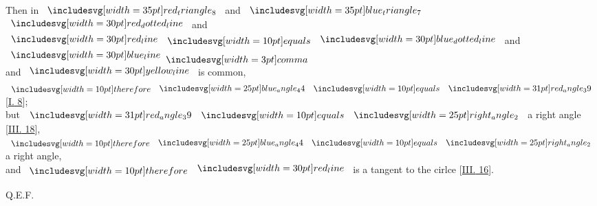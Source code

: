 \documentclass[12pt,preview]{standalone}
\begin{document}
\hfill

\hfill

\pagebreak

\begin{minipage}[t]{0.33\textwidth}
    \phantom{}
\end{minipage}%
\hfill
\begin{minipage}[t]{0.64\textwidth}
    \vspace{0pt}

    \begin{center}
        Then in $\img[0][0][35]{red_triangle_8}$ and $\img[0][0][35]{blue_triangle_7}$\\
        $\dottedredline$ and $\redline \bequals \dottedblueline$ and $\blueline \bcomma$\\
        and $\yellowline$ is common,\\
        $\btherefore \img{blue_angle_44} \bequals \img[0][0][31]{red_angle_39}$ [\hyperref[book1pr8]{\textsc{I.} 8}];\\
        but $\img[0][0][31]{red_angle_39} \bequals \img{right_angle_2}$ a right angle [\hyperref[book3pr18]{\textsc{III.} 18}],\\
        $\btherefore \img{blue_angle_44} \bequals \img{right_angle_2}$ a right angle,\\
        and $\btherefore \redline$ is a tangent to the cirlce [\hyperref[book3pr16]{\textsc{III.} 16}].
    \end{center}

    \hfill

    \hfill Q.E.F.
\end{minipage}
\end{document}
